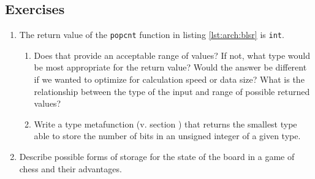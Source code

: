 \subsection{Exercises}

\begin{enumerate}[label*=\arabic*.]
    \item
        \label{ex:arch:width_type}
        The return value of the \texttt{popcnt} function in listing
        \ref{lst:arch:blsr} is \texttt{int}.
        \begin{enumerate}[label*=\arabic*.]
            \item
                \label{ex:arch:width_type:range}
                Does that provide an acceptable range of values?  If not, what
                type would be most appropriate for the return value?  Would the
                answer be different if we wanted to optimize for calculation
                speed or data size?  What is the relationship between the type
                of the input and range of possible returned values?
            \item
                \label{ex:arch:width_type:impl}
                Write a type metafunction (v. section )
                that returns the smallest type able to store the number of bits
                in an unsigned integer of a given type.
        \end{enumerate}
    \item
        \label{ex:arch:chess}
        Describe possible forms of storage for the state of the board in a game
        of chess and their advantages.
\end{enumerate}
